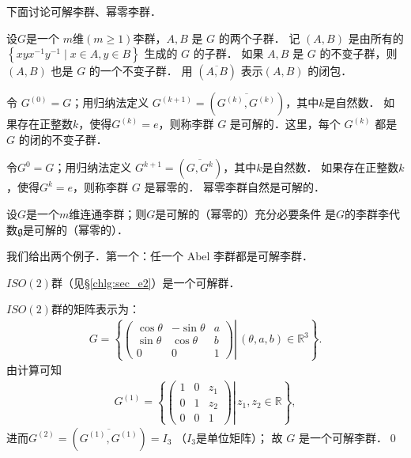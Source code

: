 下面讨论可解李群、幂零李群．

设$G$是一个 $m$维$(m \geqslant 1)$李群，$A, B$ 是 $G$ 的两个子群．
记 $(A, B)$ 是由所有的 $\left\{x y x^{-1} y^{-1} \mid x \in A, y \in B\right\}$ 生成的 $G$ 的子群．
如果 $A, B$ 是 $G$ 的不变子群，则 $(A, B)$ 也是 $G$ 的一个不变子群．
用 $(\overline{A, B})$ 表示$(A, B)$ 的闭包．

令 $G^{(0)}=G$；用归纳法定义 $G^{(k+1)}=\left(\overline{G^{(k)}, G^{(k)}}\right)$，其中$k$是自然数．
如果存在正整数$k$，使得$G^{(k)}=e$，则称{\heiti 李群 $G$ 是可解的}．这里，每个 $G^{(k)}$ 都是 $G$ 的闭的不变子群．

令$G^{0}=G$；用归纳法定义 $G^{k+1}=\left(\overline{G, G^{k}}\right)$，其中$k$是自然数．
如果存在正整数$k$，使得$G^{k}=e$，则称{\heiti 李群 $G$ 是幂零的}．
幂零李群自然是可解的．

\begin{theorem}
    设$G$是一个$m$维连通李群；则$G$是可解的（幂零的）充分必要条件
    是$G$的李群李代数$\mathfrak{g}$是可解的（幂零的）．
\end{theorem}


我们给出两个例子．第一个：任一个 Abel 李群都是可解李群．

\begin{example}
    $ISO(2)$群（见\S\ref{chlg:sec_e2}）是一个可解群．
\end{example}
$ISO(2)$群的矩阵表示为：
\begin{align*}
    G=\left\{\left.\left(\begin{array}{ccc}
        \cos \theta & -\sin \theta & a \\
        \sin \theta & \cos \theta & b \\
        0 & 0 & 1
    \end{array}\right) \right\rvert\,(\theta, a, b) \in \mathbb{R}^3\right\} .
\end{align*}
由计算可知
\begin{align*}
G^{(1)}=\left\{\left.\left(\begin{array}{ccc}
    1 & 0 & z_1 \\
    0 & 1 & z_2 \\
    0 & 0 & 1
\end{array}\right) \right\rvert\, z_1, z_2 \in \mathbb{R}\right\},
\end{align*}
进而$G^{(2)}=\left(\overline{G^{(1)}, G^{(1)}}\right)=I_3$ （$I_3$是单位矩阵）；
故 $G$ 是一个可解李群．\qed










